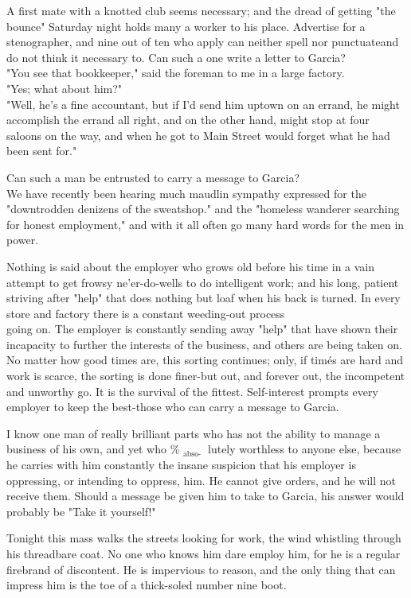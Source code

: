 \documentclass[10pt]{article}
\begin{document}
A first mate with a knotted club seems necessary; and the dread of getting "the bounce" Saturday night holds many a worker to his place. Advertise for a stenographer, and nine out of ten who apply can neither spell nor punctuateand do not think it necessary to. Can such a one write a letter to Garcia?\\
"You see that bookkeeper," said the foreman to me in a large factory.\\
"Yes; what about him?"\\
"Well, he's a fine accountant, but if I'd send him uptown on an errand, he might accomplish the errand all right, and on the other hand, might stop at four saloons on the way, and when he got to Main Street would forget what he had been sent for."

Can such a man be entrusted to carry a message to Garcia?\\
We have recently been hearing much maudlin sympathy expressed for the "downtrodden denizens of the sweatshop." and the "homeless wanderer searching for honest employment," and with it all often go many hard words for the men in power.

Nothing is said about the employer who grows old before his time in a vain attempt to get frowsy ne'er-do-wells to do intelligent work; and his long, patient striving after "help" that does nothing but loaf when his back is turned. In every store and factory there is a constant weeding-out process\\
going on. The employer is constantly sending away "help" that have shown their incapacity to further the interests of the business, and others are being taken on. No matter how good times are, this sorting continues; only, if timés are hard and work is scarce, the sorting is done finer-but out, and forever out, the incompetent and unworthy go. It is the survival of the fittest. Self-interest prompts every employer to keep the best-those who can carry a message to Garcia.

I know one man of really brilliant parts who has not the ability to manage a business of his own, and yet who \% $_{\text {abso- }}$ lutely worthless to anyone else, because he carries with him constantly the insane suspicion that his employer is oppressing, or intending to oppress, him. He cannot give orders, and he will not receive them. Should a message be given him to take to Garcia, his answer would probably be "Take it yourself!"

Tonight this mass walks the streets looking for work, the wind whistling through his threadbare coat. No one who knows him dare employ him, for he is a regular firebrand of discontent. He is impervious to reason, and the only thing that can impress him is the toe of a thick-soled number nine boot.
\end{document}
